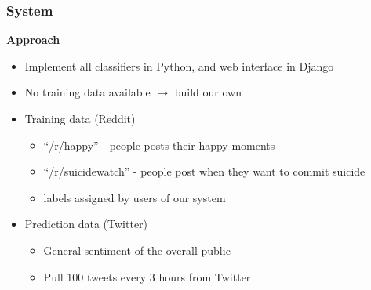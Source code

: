 \documentclass[xcolor=table]{beamer}
\begin{document}
    \begin{frame}
        \frametitle{System}
        \begin{center}
            \textbf{Approach}
        \end{center}
        \begin{itemize}
            \item{Implement all classifiers in Python, and web interface in Django}
            \item{No training data available $\rightarrow$ build our own}
            \pause
            \item{
            Training data (Reddit)
            \begin{itemize}
                \item{``/r/happy'' - people posts their happy moments}
                \item{``/r/suicidewatch'' - people post when they want to commit suicide}
                \item{labels assigned by users of our system}
            \end{itemize}
            }
            \pause
            \item{
            Prediction data (Twitter)
            \begin{itemize}
                \item{General sentiment of the overall public}
                \item{Pull 100 tweets every 3 hours from Twitter}
            \end{itemize}
            }
        \end{itemize}
    \end{frame}
    
\end{document}
